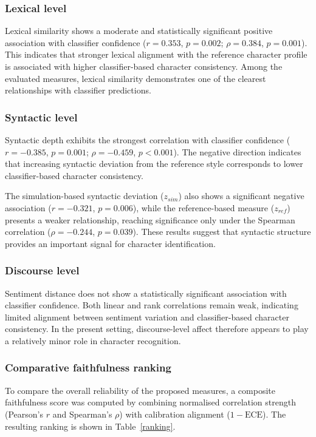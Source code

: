 \documentclass{article}
\begin{document}
\subsubsection{Lexical level}

Lexical similarity shows a moderate and statistically significant positive association with classifier confidence ($r=0.353$, $p=0.002$; $\rho=0.384$, $p=0.001$). This indicates that stronger lexical alignment with the reference character profile is associated with higher classifier-based character consistency. Among the evaluated measures, lexical similarity demonstrates one of the clearest relationships with classifier predictions.

\subsubsection{Syntactic level}

Syntactic depth exhibits the strongest correlation with classifier confidence ($r=-0.385$, $p=0.001$; $\rho=-0.459$, $p<0.001$). The negative direction indicates that increasing syntactic deviation from the reference style corresponds to lower classifier-based character consistency.

The simulation-based syntactic deviation ($z_{sim}$) also shows a significant negative association ($r=-0.321$, $p=0.006$), while the reference-based measure ($z_{ref}$) presents a weaker relationship, reaching significance only under the Spearman correlation ($\rho=-0.244$, $p=0.039$). These results suggest that syntactic structure provides an important signal for character identification.

\subsubsection{Discourse level}

Sentiment distance does not show a statistically significant association with classifier confidence. Both linear and rank correlations remain weak, indicating limited alignment between sentiment variation and classifier-based character consistency. In the present setting, discourse-level affect therefore appears to play a relatively minor role in character recognition.

\subsubsection{Comparative faithfulness ranking}

To compare the overall reliability of the proposed measures, a composite faithfulness score was computed by combining normalised correlation strength (Pearson’s $r$ and Spearman’s $\rho$) with calibration alignment ($1-\mathrm{ECE}$). The resulting ranking is shown in Table~\ref{ranking}.
\end{document}
